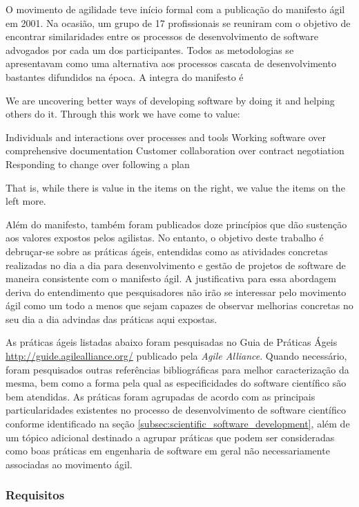 \documentclass[
	article,			%
	11pt,				%
	oneside,			%
	a4paper,			%
	english,			%
	brazil,				%
	sumario=tradicional
	]{abntex2}
\begin{document}
O movimento de agilidade teve início formal com a publicação do manifesto ágil em 2001. Na ocasião, um grupo de 17 profissionais se reuniram com o objetivo de encontrar similaridades entre os processos de desenvolvimento de software advogados por cada um dos participantes. Todos as metodologias se apresentavam como uma alternativa aos processos cascata de desenvolvimento bastantes difundidos na época. A integra do manifesto é

\begin{citacao}
We are uncovering better ways of developing software by doing it and helping others do it. Through this work we have come to value:

Individuals and interactions over processes and tools
Working software over comprehensive documentation
Customer collaboration over contract negotiation
Responding to change over following a plan

That is, while there is value in the items on the right, we value the items on the left more.
\end{citacao}

Além do manifesto, também foram publicados doze princípios que dão sustenção aos valores expostos pelos agilistas. No entanto, o objetivo deste trabalho é debruçar-se sobre as práticas ágeis, entendidas como as atividades concretas realizadas no dia a dia para desenvolvimento e gestão de projetos de software de maneira consistente com o manifesto ágil. A justificativa para essa abordagem deriva do entendimento que pesquisadores não irão se interessar pelo movimento ágil como um todo a menos que sejam capazes de observar melhorias concretas no seu dia a dia advindas das práticas aqui expostas.

As práticas ágeis listadas abaixo foram pesquisadas no Guia de Práticas Ágeis \url{http://guide.agilealliance.org/} publicado pela \emph{Agile Alliance}. Quando necessário, foram pesquisados outras referências bibliográficas para melhor caracterização da mesma, bem como a forma pela qual as especificidades do software científico são bem atendidas. As práticas foram agrupadas de acordo com as principais particularidades existentes no processo de desenvolvimento de software científico conforme identificado na seção \ref{subsec:scientific_software_development}, além de um tópico adicional destinado a agrupar práticas que podem ser consideradas como boas práticas em engenharia de software em geral não necessariamente associadas ao movimento ágil.

\subsubsection*{Requisitos}
\end{document}
